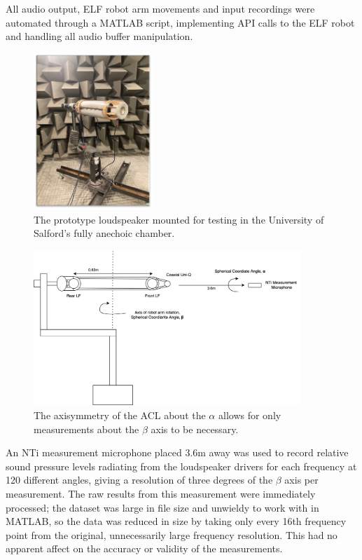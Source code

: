 \documentclass{report}
\begin{document}
        All audio output, ELF robot arm movements and input recordings were automated through a MATLAB script, implementing API calls to the ELF robot and handling all audio buffer manipulation.

        \begin{figure}[H]
            \centering
            \includegraphics[width = 0.4\textwidth]{figs/speakerOnRobot.png}%
            \caption{The prototype loudspeaker mounted for testing in the University of Salford's fully anechoic chamber.}
            \label{speakerOnRobot}
        \end{figure}

        \begin{figure}[H]
            \centering
            \includegraphics[width = 0.9\textwidth]{figs/speakerDiagram.png}%
            \caption{The axisymmetry of the ACL about the $\alpha$ allows for only measurements about the $\beta$ axis to be necessary.}
            \label{speakerDiagram}
        \end{figure}
        \newpage

        An NTi measurement microphone placed 3.6m away was used to record relative sound pressure levels radiating from the loudspeaker drivers for each frequency at 120 different angles, giving a resolution of three degrees of the $\beta$ axis per measurement.
        The raw results from this measurement were immediately processed; the dataset was large in file size and unwieldy to work with in MATLAB, so the data was reduced in size by taking only every 16th frequency point from the original, unnecessarily large frequency resolution.
        This had no apparent affect on the accuracy or validity of the measurements.
\end{document}

